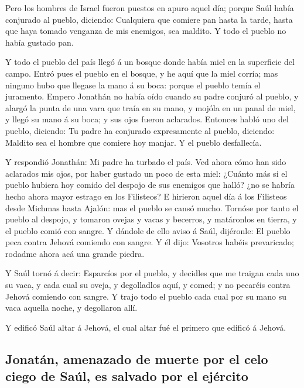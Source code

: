  Pero los hombres de Israel fueron puestos en apuro aquel
día; porque Saúl había conjurado al pueblo, diciendo: Cualquiera que
comiere pan hasta la tarde, hasta que haya tomado venganza de mis
enemigos, sea maldito. Y todo el pueblo no había gustado pan.

 Y todo el pueblo del país llegó á un bosque donde había
miel en la superficie del campo.  Entró pues el pueblo en
el bosque, y he aquí que la miel corría; mas ninguno hubo que llegase la
mano á su boca: porque el pueblo temía el juramento. 
Empero Jonathán no había oído cuando su padre conjuró al pueblo, y
alargó la punta de una vara que traía en su mano, y mojóla en un panal
de miel, y llegó su mano á su boca; y sus ojos fueron aclarados.
 Entonces habló uno del pueblo, diciendo: Tu padre ha
conjurado expresamente al pueblo, diciendo: Maldito sea el hombre que
comiere hoy manjar. Y el pueblo desfallecía.

 Y respondió Jonathán: Mi padre ha turbado el país. Ved
ahora cómo han sido aclarados mis ojos, por haber gustado un poco de
esta miel:  ¿Cuánto más si el pueblo hubiera hoy comido del
despojo de sus enemigos que halló? ¿no se habría hecho ahora mayor
estrago en los Filisteos?  E hirieron aquel día á los
Filisteos desde Michmas hasta Ajalón: mas el pueblo se cansó mucho.
 Tornóse por tanto el pueblo al despojo, y tomaron ovejas y
vacas y becerros, y matáronlos en tierra, y el pueblo comió con sangre.
 Y dándole de ello aviso á Saúl, dijéronle: El pueblo peca
contra Jehová comiendo con sangre. Y él dijo: Vosotros habéis
prevaricado; rodadme ahora acá una grande piedra.

 Y Saúl tornó á decir: Esparcíos por el pueblo, y decidles
que me traigan cada uno su vaca, y cada cual su oveja, y degolladlos
aquí, y comed; y no pecaréis contra Jehová comiendo con sangre. Y trajo
todo el pueblo cada cual por su mano su vaca aquella noche, y degollaron
allí.

 Y edificó Saúl altar á Jehová, el cual altar fué el
primero que edificó á Jehová.

\hypertarget{jonatuxe1n-amenazado-de-muerte-por-el-celo-ciego-de-sauxfal-es-salvado-por-el-ejuxe9rcito}{%
\subsection{Jonatán, amenazado de muerte por el celo ciego de Saúl, es
salvado por el
ejército}\label{jonatuxe1n-amenazado-de-muerte-por-el-celo-ciego-de-sauxfal-es-salvado-por-el-ejuxe9rcito}}

